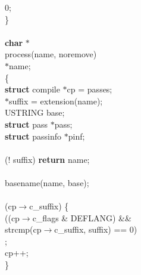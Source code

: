 \begin{flushleft}
\hspace*{3\indentation}{\bf return} 0;\mbox{}\\
\}\mbox{}\\
\hspace*{6\indentation}\mbox{}\\
{\bf char} $\ast$\mbox{}\\
process(name, noremove)\mbox{}\\
\hspace*{3\indentation}{\bf char} $\ast$name;\mbox{}\\
\{\mbox{}\\
\hspace*{3\indentation}{\bf register} {\bf struct} compile $\ast$cp = passes;\mbox{}\\
\hspace*{3\indentation}{\bf char} $\ast$suffix = extension(name);\mbox{}\\
\hspace*{3\indentation}USTRING base;\mbox{}\\
\hspace*{3\indentation}{\bf register} {\bf struct} pass $\ast$pass;\mbox{}\\
\hspace*{3\indentation}{\bf register} {\bf struct} passinfo $\ast$pinf;\mbox{}\\
\mbox{}\\
\hspace*{3\indentation}{\bf if} (! suffix) {\bf return} name;\mbox{}\\
\mbox{}\\
\hspace*{3\indentation}basename(name, base);\mbox{}\\
\mbox{}\\
\hspace*{3\indentation}{\bf while} (cp$\rightarrow$c\_suffix) \{\mbox{}\\
\hspace*{6\indentation}{\bf if} ((cp$\rightarrow$c\_flags \& DEFLANG) \&\&\mbox{}\\
\hspace*{10\indentation}strcmp(cp$\rightarrow$c\_suffix, suffix) == 0)\mbox{}\\
\hspace*{9\indentation}{\bf break};\mbox{}\\
\hspace*{6\indentation}cp++;\mbox{}\\
\hspace*{3\indentation}\}\mbox{}\\

\end{flushleft}
